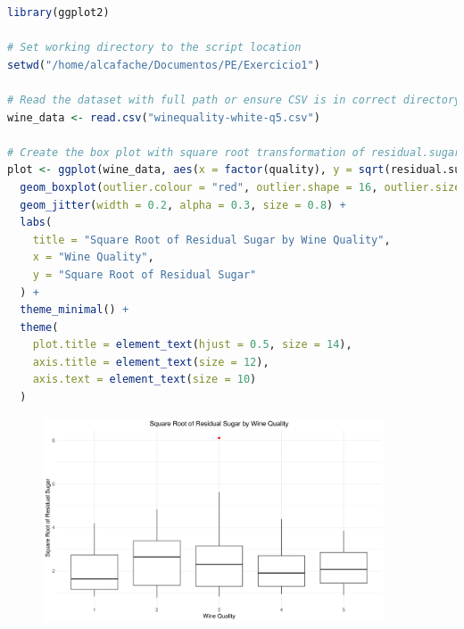 \documentclass[11pt,a4paper]{article}
\begin{document}
\begin{lstlisting}[language=R]
library(ggplot2)

# Set working directory to the script location
setwd("/home/alcafache/Documentos/PE/Exercicio1")

# Read the dataset with full path or ensure CSV is in correct directory
wine_data <- read.csv("winequality-white-q5.csv")

# Create the box plot with square root transformation of residual.sugar
plot <- ggplot(wine_data, aes(x = factor(quality), y = sqrt(residual.sugar))) +
  geom_boxplot(outlier.colour = "red", outlier.shape = 16, outlier.size = 2) +
  geom_jitter(width = 0.2, alpha = 0.3, size = 0.8) +
  labs(
    title = "Square Root of Residual Sugar by Wine Quality",
    x = "Wine Quality",
    y = "Square Root of Residual Sugar"
  ) +
  theme_minimal() +
  theme(
    plot.title = element_text(hjust = 0.5, size = 14),
    axis.title = element_text(size = 12),
    axis.text = element_text(size = 10)
  )
\end{lstlisting}

\vspace{1cm}

\begin{figure}[htbp]
    \centering
    \includegraphics[width=0.9\textwidth]{wine_quality_boxplot.png}
\end{figure}
\end{document}
